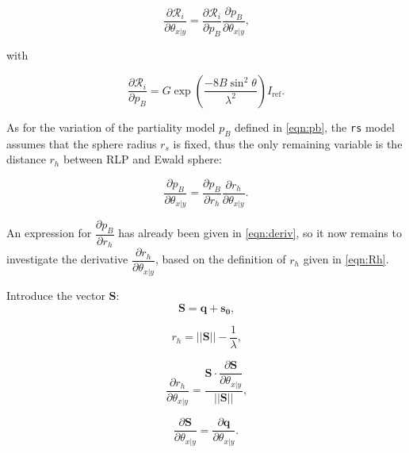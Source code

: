 \documentclass[12pt, letterpaper]{article}
\begin{document}
      \begin{equation}
    \frac{\partial\mathscr{R}_i}{\partial \theta_{x\mathrm{|}y}} = 
  \frac{\partial\mathscr{R}_i}{\partial p_B}
   \frac{\partial p_B} {\partial \theta_{x\mathrm{|}y}}
    \text{,}
    \label{eqn:dthxy}
  \end{equation}

with

      \begin{equation} 
  \frac{\partial\mathscr{R}_i}{\partial p_B} =
  G  \exp(\dfrac{-8B\sin^2\theta}{\lambda^2}) I_{\mathrm{ref}}
    \text{.}
    \label{eqn:P_terms}
  \end{equation}

As for the variation of the partiality model $p_B$ defined in \eqref{eqn:pb}, the {\tt rs}
model assumes that the sphere radius $r_s$ is fixed, thus the only remaining variable is the
distance  $r_h$ between RLP and Ewald sphere:

   \begin{equation}
   \frac{\partial p_B} {\partial \theta_{x\mathrm{|}y}} = 
  \frac{\partial p_B}{\partial r_h}
   \frac{\partial r_h} {\partial \theta_{x\mathrm{|}y}}
    \text{.}
    \label{eqn:dpb2}
  \end{equation}


  \par An expression for $\dfrac{\partial p_B}{\partial r_h}$ has already been 
  given in \eqref{eqn:deriv}, so it now
  remains to investigate the derivative $\dfrac{\partial r_h} {\partial \theta_{x\mathrm{|}y}}$,
  based on the definition of $r_h$ given in \eqref{eqn:Rh}.

Introduce the vector $\mathbf{S}$:
   \begin{equation}
   \mathbf{S} = \mathbf{q}+\mathbf{s_0}
    \text{,}
    \label{eqn:SS}
  \end{equation}

   \begin{equation}
 {r_h} = ||\mathbf{S}||-\dfrac{1}{ \lambda}
     \text{,}
    \label{eqn:sss}
  \end{equation}
  
    \begin{equation}
   \dfrac{\partial r_h} {\partial \theta_{x\mathrm{|}y}} = 
   \dfrac
   {\mathbf{S}\cdot{
   \dfrac{\partial \mathbf{S}} {\partial \theta_{x\mathrm{|}y}}
   }}
   {||\mathbf{S}||}
    \text{,}
    \label{eqn:rhth}
  \end{equation}

    \begin{equation}
   \dfrac{\partial \mathbf{S}} {\partial \theta_{x\mathrm{|}y}} = 
  {
   \dfrac{\partial \mathbf{q}} {\partial \theta_{x\mathrm{|}y}}
   }
    \text{.}
    \label{eqn:derivsq}
  \end{equation}
\end{document}
